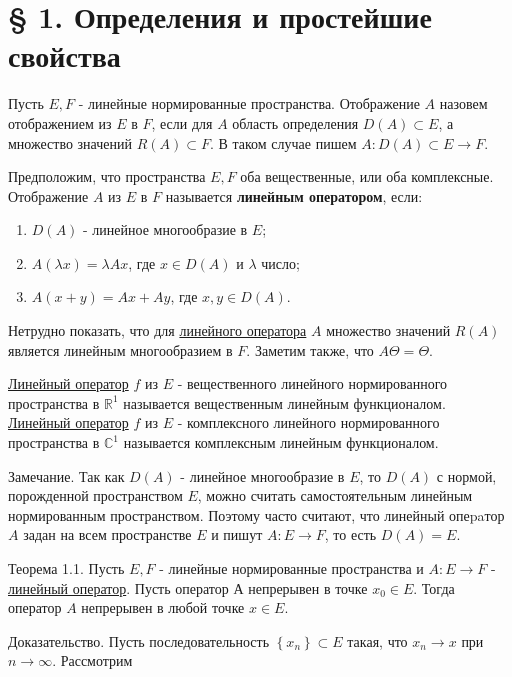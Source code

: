 \documentclass[a4paper, 12pt]{extarticle}
\begin{document}
\section*{§ 1. Определения и простейшие свойства}
Пусть $E, F$ - линейные нормированные пространства. Отображение $A$ назовем отображением из $E$ в $F$, если для $A$ область определения $D(A) \subset E$, а множество значений $R(A) \subset F$. В таком случае пишем $A: D(A) \subset E \rightarrow F$.

Предположим, что пространства $E, F$ оба вещественные, или оба комплексные. Отображение $A$ из $E$ в $F$ называется \hypertarget{linOperator}{\textbf{линейным оператором}}, если:

\begin{enumerate}
	\item $D(A)$ - линейное многообразие в $E$;

	\item $A(\lambda x)=\lambda A x$, где $x \in D(A)$ и $\lambda$ число;

	\item $A(x+y)=A x+A y$, где $x, y \in D(A)$.

\end{enumerate}

Нетрудно показать, что для \hyperlink{linOperator}{линейного оператора} $A$ множество значений $R(A)$ является линейным многообразием в $F$. Заметим также, что $A \Theta=\Theta$.

\hyperlink{linOperator}{Линейный оператор} $f$ из $E$ - вещественного линейного нормированного пространства в $\mathbb{R}^{1}$ называется вещественным линейным функционалом. \hyperlink{linOperator}{Линейный оператор} $f$ из $E$ - комплексного линейного нормированного пространства в $\mathbb{C}^{1}$ называется комплексным линейным функционалом.

Замечание. Так как $D(A)$ - линейное многообразие в $E$, то $D(A)$ с нормой, порожденной пространством $E$, можно считать самостоятельным линейным нормированным пространством. Поэтому часто считают, что линейный опеpaтор $A$ задан на всем пространстве $E$ и пишут $A: E \rightarrow F$, то есть $D(A)=E$.

Теорема 1.1. Пусть $E, F$ - линейные нормированные пространства и $A: E \rightarrow F$ - \hyperlink{linOperator}{линейный оператор}. Пусть оператор А непрерывен в точке $x_{0} \in E$. Тогда оператор $A$ непрерывен в любой точке $x \in E$.

Доказательство. Пусть последовательность $\left\{x_{n}\right\} \subset E$ такая, что $x_{n} \rightarrow x$ при $n \rightarrow \infty$. Рассмотрим
\end{document}
